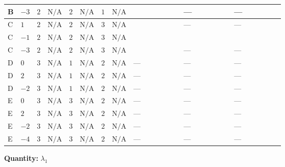 \documentclass[8pt]{article}
\begin{document}
\begin{landscape}
\begin{longtable}{@{}llcccccc >{\raggedright\arraybackslash}p{0.21\linewidth} >{\raggedright\arraybackslash}p{0.21\linewidth} >{\raggedright\arraybackslash}p{0.21\linewidth}@{}}
\midrule
B & $-3$ & $2$ & $\text{N/A}$ & $2$ & $\text{N/A}$ & $1$ & $\text{N/A}$ & \scriptsize\adjustbox{max width=\linewidth}{$\begin{gathered} +\frac{{\lambda_{HS_2}^{(A)}}^2}{4}\end{gathered}$} & --- & --- \\
\midrule
C & $1$ & $2$ & $\text{N/A}$ & $2$ & $\text{N/A}$ & $3$ & $\text{N/A}$ & \scriptsize\adjustbox{max width=\linewidth}{$\begin{gathered} +\frac{{\lambda_{HS_2}^{(A)}}^2}{4}\end{gathered}$} & --- & --- \\
\midrule
C & $-1$ & $2$ & $\text{N/A}$ & $2$ & $\text{N/A}$ & $3$ & $\text{N/A}$ & \scriptsize\adjustbox{max width=\linewidth}{$\begin{gathered} +\frac{{\lambda_{HS_2}^{(A)}}^2}{4}\end{gathered}$} & \scriptsize\adjustbox{max width=\linewidth}{$\begin{gathered} +8 {\lambda_{7}} \left({\lambda_{7}}\right)^{*}\end{gathered}$} & \scriptsize\adjustbox{max width=\linewidth}{$\begin{gathered} +4 {\lambda_{H H^\dagger S_1^\dagger S_2^\dagger}^{\rm Cross}} \left({\lambda_{H H^\dagger S_1^\dagger S_2^\dagger}^{\rm Cross}}\right)^{*}\end{gathered}$} \\
\midrule
C & $-3$ & $2$ & $\text{N/A}$ & $2$ & $\text{N/A}$ & $3$ & $\text{N/A}$ & \scriptsize\adjustbox{max width=\linewidth}{$\begin{gathered} +\frac{{\lambda_{HS_2}^{(A)}}^2}{4}\end{gathered}$} & --- & --- \\
\midrule
D & $0$ & $3$ & $\text{N/A}$ & $1$ & $\text{N/A}$ & $2$ & $\text{N/A}$ & --- & --- & --- \\
\midrule
D & $2$ & $3$ & $\text{N/A}$ & $1$ & $\text{N/A}$ & $2$ & $\text{N/A}$ & --- & --- & --- \\
\midrule
D & $-2$ & $3$ & $\text{N/A}$ & $1$ & $\text{N/A}$ & $2$ & $\text{N/A}$ & --- & --- & --- \\
\midrule
E & $0$ & $3$ & $\text{N/A}$ & $3$ & $\text{N/A}$ & $2$ & $\text{N/A}$ & --- & --- & --- \\
\midrule
E & $2$ & $3$ & $\text{N/A}$ & $3$ & $\text{N/A}$ & $2$ & $\text{N/A}$ & --- & --- & --- \\
\midrule
E & $-2$ & $3$ & $\text{N/A}$ & $3$ & $\text{N/A}$ & $2$ & $\text{N/A}$ & --- & --- & --- \\
\midrule
E & $-4$ & $3$ & $\text{N/A}$ & $3$ & $\text{N/A}$ & $2$ & $\text{N/A}$ & --- & --- & --- \\
\midrule
\bottomrule
\end{longtable}
\clearpage
\noindent\textbf{Quantity: }$\lambda_1$\par\smallskip

\end{landscape}
\end{document}
